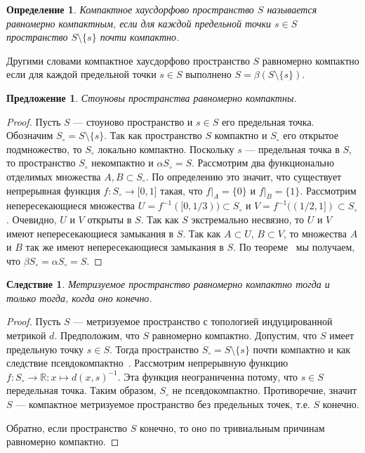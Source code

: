 \documentclass[12pt]{article}
\newtheorem{proposition}[theorem]{Предложение}
\newtheorem{corollary}[theorem]{Следствие}
\newtheorem{definition}[theorem]{Определение}
\begin{document}
\begin{definition} Компактное хаусдорфово пространство $S$ называется равномерно
    компактным, если для каждой предельной точки $s\in S$ пространство
    $S\setminus \{s\}$ почти компактно.
\end{definition}

Другими словами компактное хаусдорфово пространство $S$ равномерно компактно
если для каждой предельной точки $s\in S$ выполнено $S=\beta(S\setminus \{s\})$.

\begin{proposition}\label{StoneSpUnifComp} Стоуновы пространства равномерно
    компактны.
\end{proposition}
\begin{proof} Пусть $S$ --- стоуново пространство и $s\in S$ его предельная
    точка. Обозначим $S_\circ=S\setminus \{s\}$. Так как пространство $S$
    компактно и $S_\circ$ его открытое подмножество, то $S_\circ$ локально
    компактно. Поскольку $s$ --- предельная точка в $S$, то пространство
    $S_\circ$ некомпактно и $\alpha S_\circ=S$. Рассмотрим два функционально
    отделимых множества $A,B\subset S_\circ$. По определению это значит, что
    существует непрерывная функция $f:S_\circ\to\mathbb[0,1]$ такая, что
    $f|_A=\{0\}$ и $f|_B=\{1\}$. Рассмотрим непересекающиеся множества
    $U=f^{-1}([0,1/3))\subset S_\circ$ %
    и $V=f^{-1}((1/2,1])\subset S_\circ$. %
    Очевидно, $U$ и $V$ открыты в $S$. Так как $S$ экстремально несвязно, то $U$
    и $V$ имеют непересекающиеся замыкания в $S$. Так как $A\subset U$,
    $B\subset V$,  то множества $A$ и $B$ так же имеют непересекающиеся
    замыкания в $S$. По теореме~\cite[теорема 3.6.2]{EngkingGenTop} мы получаем,
    что $\beta S_\circ=\alpha S_\circ=S$.
\end{proof}

\begin{corollary}\label{MesSpUnifCompIffFin} Метризуемое пространство равномерно
    компактно тогда и только тогда, когда оно конечно.
\end{corollary}
\begin{proof} Пусть $S$ --- метризуемое пространство с топологией индуцированной
    метрикой $d$. Предположим, что $S$ равномерно компактно. Допустим, что $S$
    имеет предельную точку $s\in S$. Тогда пространство $S_\circ= S\setminus
        \{s\}$ почти компактно и как следствие псевдокомпактно~\cite[предложение
        1.3.10]{HrusPsdCompTopSp}. Рассмотрим непрерывную функцию
    $f:S_\circ\to\mathbb{R}:x\mapsto {d(x,s)}^{-1}$. Эта функция неограниченна
    потому, что $s\in S$ передельная точка. Таким образом, $S_\circ$ не
    псевдокомпактно. Противоречие, значит $S$ --- компактное метризуемое
    пространство без предельных точек, т.е. $S$ конечно.

    Обратно, если пространство $S$ конечно, то оно по тривиальным причинам
    равномерно компактно.
\end{proof}
\end{document}
